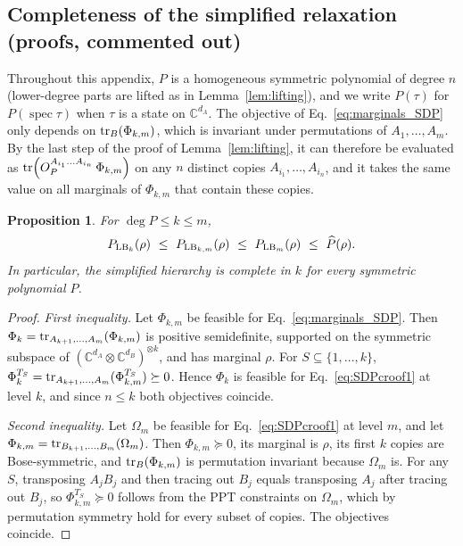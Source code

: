 \documentclass[aps,pra,twocolumn,showpacs,superscriptaddress,groupedaddress]{revtex4-2}
\DeclareMathOperator{\spec}{spec}
\newcommand{\C}{\mathds{C}}
\newtheorem{proposition}[theorem]{Proposition}
\begin{document}
\begin{widetext}
\iffalse
    \section{Completeness of the simplified relaxation (proofs, commented out)}
    Throughout this appendix, $P$ is a homogeneous symmetric polynomial of degree $n$ (lower-degree parts are lifted as in Lemma~\ref{lem:lifting}), and we write $P(\tau)$ for $P(\spec\tau)$ when $\tau$ is a state on $\C^{d_A}$. The objective of Eq.~\eqref{eq:marginals_SDP} only depends on $\tr_{B}(\Phi_{k,m})$, which is invariant under permutations of $A_1,\dots,A_m$. By the last step of the proof of Lemma~\ref{lem:lifting}, it can therefore be evaluated as $\tr(O_P^{A_{i_1}\dots A_{i_n}}\,\Phi_{k,m})$ on any $n$ distinct copies $A_{i_1},\dots,A_{i_n}$, and it takes the same value on all marginals of $\Phi_{k,m}$ that contain these copies.

    \begin{proposition}\label{prop:sandwich}
    For $\deg P\leq k\leq m$,
    \begin{equation}
        P_{{\rm LB}_k}(\rho)\ \leq\ P_{{\rm LB}_{k,m}}(\rho)\ \leq\ P_{{\rm LB}_m}(\rho)\ \leq\ \widehat P(\rho).
    \end{equation}
    In particular, the simplified hierarchy is complete in $k$ for every symmetric polynomial $P$.
    \end{proposition}

    \begin{proof}
    \emph{First inequality.} Let $\Phi_{k,m}$ be feasible for Eq.~\eqref{eq:marginals_SDP}. Then $\Phi_k=\tr_{A_{k+1},\dots,A_m}(\Phi_{k,m})$ is positive semidefinite, supported on the symmetric subspace of $(\C^{d_A}\otimes\C^{d_B})^{\otimes k}$, and has marginal $\rho$. For $S\subseteq\{1,\dots,k\}$, $\Phi_k^{T_S}=\tr_{A_{k+1},\dots,A_m}(\Phi_{k,m}^{T_S})\succeq0$. Hence $\Phi_k$ is feasible for Eq.~\eqref{eq:SDPcroof1} at level $k$, and since $n\leq k$ both objectives coincide.

    \emph{Second inequality.} Let $\Omega_m$ be feasible for Eq.~\eqref{eq:SDPcroof1} at level $m$, and let $\Phi_{k,m}=\tr_{B_{k+1},\dots,B_m}(\Omega_m)$. Then $\Phi_{k,m}\succeq0$, its marginal is $\rho$, its first $k$ copies are Bose-symmetric, and $\tr_B(\Phi_{k,m})$ is permutation invariant because $\Omega_m$ is. For any $S$, transposing $A_jB_j$ and then tracing out $B_j$ equals transposing $A_j$ after tracing out $B_j$, so $\Phi_{k,m}^{T_S}\succeq0$ follows from the PPT constraints on $\Omega_m$, which by permutation symmetry hold for every subset of copies. The objectives coincide.


\end{proof}
\end{widetext}
\end{document}
